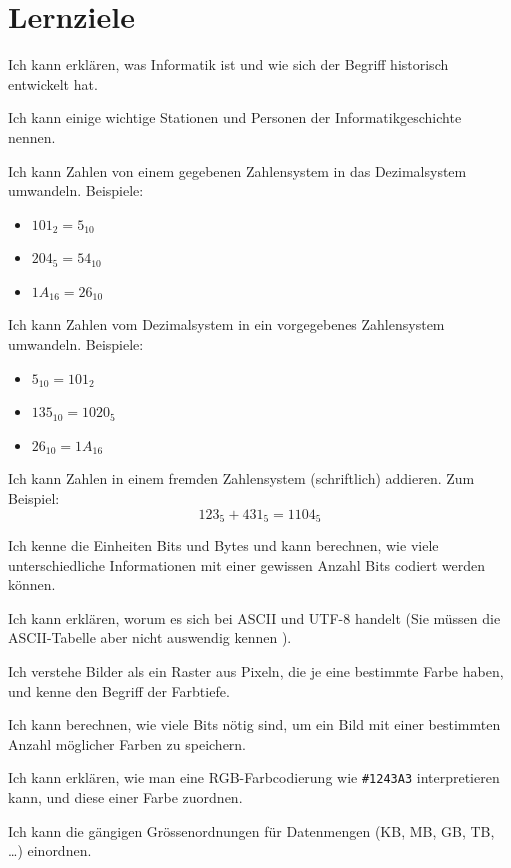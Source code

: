 \chapter{Lernziele}
\begin{todolist}
    \item Ich kann erklären, was Informatik ist und wie sich der Begriff historisch entwickelt hat.
    \item Ich kann einige wichtige Stationen und Personen der Informatikgeschichte nennen.
    \item Ich kann Zahlen von einem gegebenen Zahlensystem in das Dezimalsystem umwandeln. Beispiele:
    \begin{itemize}
        \item $101_2 = 5_{10}$
        \item $204_5 = 54_{10}$
        \item $1A_{16} = 26_{10}$
    \end{itemize}
    \item Ich kann Zahlen vom Dezimalsystem in ein vorgegebenes Zahlensystem umwandeln. Beispiele:
    \begin{itemize}
        \item $5_{10} = 101_2$
        \item $135_{10}=1020_5$
        \item $26_{10}=1A_{16}$
    \end{itemize}
    \item Ich kann Zahlen in einem fremden Zahlensystem (schriftlich) addieren. Zum Beispiel:
    \[123_5 + 431_5 = 1104_5\]
    \item Ich kenne die Einheiten Bits und Bytes und kann berechnen, wie viele unterschiedliche Informationen mit einer gewissen Anzahl Bits codiert werden können.
    \item Ich kann erklären, worum es sich bei ASCII und UTF-8 handelt (Sie müssen die ASCII-Tabelle aber nicht auswendig kennen ).
    \item Ich verstehe Bilder als ein Raster aus Pixeln, die je eine bestimmte Farbe haben, und kenne den Begriff der Farbtiefe.
    \item Ich kann berechnen, wie viele Bits nötig sind, um ein Bild mit einer bestimmten Anzahl möglicher Farben zu speichern.
    \item Ich kann erklären, wie man eine RGB-Farbcodierung wie \texttt{\#1243A3} interpretieren kann, und diese einer Farbe zuordnen.
    \item Ich kann die gängigen Grössenordnungen für Datenmengen (KB, MB, GB, TB, \ldots) einordnen.

\end{todolist}
